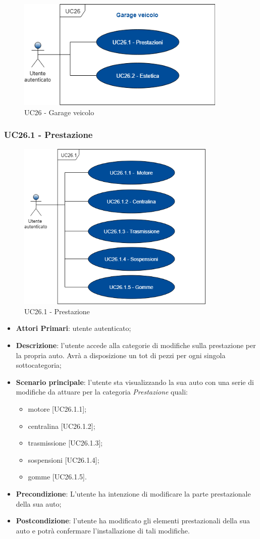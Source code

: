 \begin{figure}[h]
	\includegraphics[width=10cm]{res/images/UC26-Garage.png}
	\centering
	\caption{UC26 - Garage veicolo}
\end{figure}
\subsubsection{UC26.1 - Prestazione}
\begin{figure}[h]
	\includegraphics[width=9.5cm]{res/images/UC26-1Prestazioni.png}
	\centering
	\caption{UC26.1 - Prestazione}
\end{figure}
\begin{itemize}
	\item \textbf{Attori Primari}: utente autenticato;
	\item \textbf{Descrizione}: l'utente accede alla categorie di modifiche sulla prestazione per la propria auto. Avrà a disposizione un tot di pezzi per ogni singola sottocategoria;
	\item \textbf{Scenario principale}: l'utente sta visualizzando la sua auto con una serie di modifiche da attuare per la categoria \textit{Prestazione} quali:
	\begin{itemize}
		\item motore [UC26.1.1];
		\item centralina [UC26.1.2];
		\item trasmissione [UC26.1.3];
		\item sospensioni [UC26.1.4];
		\item gomme [UC26.1.5].
	\end{itemize}
	\item \textbf{Precondizione}: L'utente ha intenzione di modificare la parte prestazionale della sua auto;
	\item \textbf{Postcondizione}: l'utente ha modificato gli elementi prestazionali della sua auto e potrà confermare l'installazione di tali modifiche.
\end{itemize}
